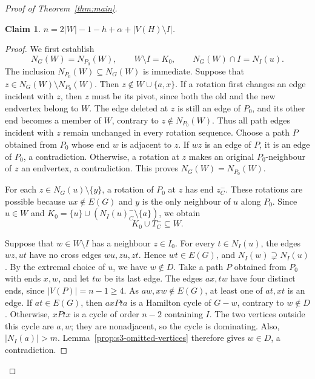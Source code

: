 \documentclass[11pt]{article}
\numberwithin{equation}{section}
\theoremstyle{plain}
\theoremstyle{definition}
\theoremstyle{plain}
\newtheorem{claim}{Claim}[section]
\begin{document}
\begin{proof}[Proof of Theorem~\ref{thm:main}]
\begin{claim}\label{claim:n}
    $n=2|W|-1-h+\alpha+|V(H)\setminus I|$.
\end{claim}

\begin{proof}
We first establish
\begin{equation}\label{eq:s4-rotation-properties}
 N_G(W)=N_{P_0}(W),\qquad
 W\setminus I=K_0,\qquad
 N_G(W)\cap I=N_I(u).
\end{equation}
The inclusion $N_{P_0}(W)\subseteq N_G(W)$ is immediate.
Suppose that $z\in N_G(W)\setminus N_{P_0}(W)$.
Then $z\notin W\cup\{a,x\}$.
If a rotation first changes an edge incident with $z$, then $z$ must
be its pivot, since both the old and the new endvertex belong to $W$.
The edge deleted at $z$ is still an edge of $P_0$, and its other end
becomes a member of $W$, contrary to $z\notin N_{P_0}(W)$.
Thus all path edges incident with $z$ remain unchanged in every
rotation sequence.
Choose a path $P$ obtained from $P_0$ whose end $w$ is adjacent to $z$.
If $wz$ is an edge of $P$, it is an edge of $P_0$, a contradiction.
Otherwise, a rotation at $z$ makes an original $P_0$-neighbour of $z$
an endvertex,   a contradiction.
This proves $N_G(W)=N_{P_0}(W)$.

For each $z\in N_G(u)\setminus\{y\}$, a rotation of $P_0$ at $z$ has
end $z_C^-$.
These rotations are possible because $ux\notin E(G)$ and $y$ is the
only neighbour of $u$ along $P_0$.
Since $u\in W$ and
$K_0=\{u\}\cup(N_I(u)_C^-\setminus\{a\})$, we obtain
\begin{equation}\label{eq:s4-initial-rotations}
 K_0\cup T_C^-\subseteq W.
\end{equation}

Suppose that $w\in W\setminus I$ has a neighbour $z\in I_0$.
For every $t\in N_I(u)$, the edges $wz,ut$ have no cross edges
$wu,zu,zt$.
Hence $wt\in E(G)$, and $N_I(w)\supsetneq N_I(u)$.
By the extremal choice of $u$, we have $w\notin D$.
Take a path $P$ obtained from $P_0$ with ends $x,w$, and let $tw$
be its last edge.
The edges $ax,tw$ have four distinct ends, since
$|V(P)|=n-1\geq4$.
As $aw,xw\notin E(G)$, at least one of $at,xt$ is an edge.
If $at\in E(G)$, then $axPt a$ is a Hamilton cycle of $G-w$,
contrary to $w\notin D$.
Otherwise, $xPtx$ is a cycle of order $n-2$ containing $I$.
The two vertices outside this cycle are $a,w$; they are nonadjacent,
so the cycle is dominating. Also, $|N_I(a)|>m$.
Lemma~\ref{prop:s3-omitted-vertices} therefore gives $w\in D$,
  a contradiction.


\end{proof}
\end{proof}
\end{document}
